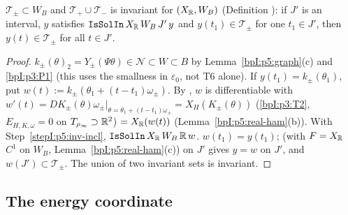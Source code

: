 \begin{lemma}[Invariance]\label{bpI:p5:invariance}
$\mathcal T_\pm\subset W_B$ and $\mathcal T_+\cup\mathcal T_-$ is invariant for $(X_{\mathbb{R}},W_B)$ (Definition ): if $J'$ is an interval, $y$ satisfies $\texttt{IsSolIn}\,X_{\mathbb{R}}\,W_B\,J'\,y$ and $y(t_1)\in\mathcal T_\pm$ for one $t_1\in J'$, then $y(t)\in\mathcal T_\pm$ for all $t\in J'$.
\end{lemma}
\begin{proof}
\label{stepI:p5:inv-incl} $k_\pm(\theta)_2=Y_\pm(\Psi\theta)\in\mathcal N\subset W\subset B$ by Lemma~\ref{bpI:p5:graph}(c) and \ref{bpI:p3:P1} (this uses the smallness in $\varepsilon_0$, not T6 alone).
\label{stepI:p5:inv-sol} If $y(t_1)=k_\pm(\theta_1)$, put $w(t):=k_\pm(\theta_1+(t-t_1)\omega_\pm)$. By , $w$ is differentiable with $w'(t)=DK_\pm(\theta)\omega_\pm|_{\theta=\theta_1+(t-t_1)\omega_\pm}=X_H(K_\pm(\theta))$ (\ref{bpI:p3:T2}, $E_{H,K,\omega}=0$ on $T_{\rho_\infty}\supset\mathbb{R}^2$) $=X_{\mathbb{R}}(w(t))$ (Lemma~\ref{bpI:p5:real-ham}(b)). With Step~\ref{stepI:p5:inv-incl}, $\texttt{IsSolIn}\,X_{\mathbb{R}}\,W_B\,\mathbb{R}\,w$.
\label{stepI:p5:inv-uniq} $w(t_1)=y(t_1)$;  (with $F=X_{\mathbb{R}}$ $C^1$ on $W_B$, Lemma~\ref{bpI:p5:real-ham}(c)) on $J'$ gives $y=w$ on $J'$, and $w(J')\subset\mathcal T_\pm$. The union of two invariant sets is invariant.
\end{proof}

\subsection{The energy coordinate}\label{bpI:p5:sec-energy}

